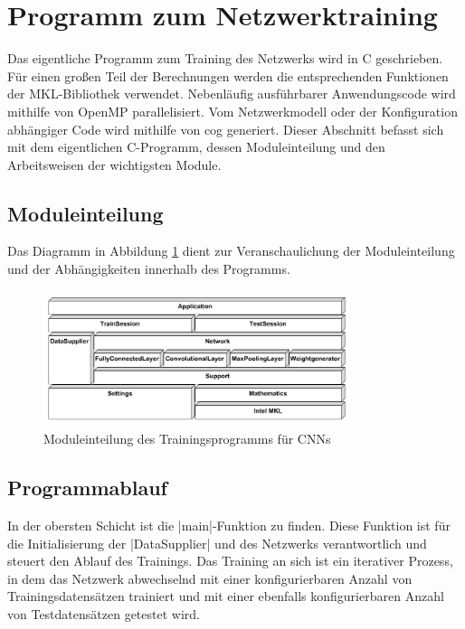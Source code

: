 \documentclass[../main.tex]{subfiles}
\begin{document}
\section{Programm zum Netzwerktraining}
Das eigentliche Programm zum Training des Netzwerks wird in C geschrieben. Für einen großen Teil der Berechnungen werden die entsprechenden Funktionen der MKL-Bibliothek verwendet. Nebenläufig ausführbarer Anwendungscode wird mithilfe von OpenMP parallelisiert. Vom Netzwerkmodell oder der Konfiguration abhängiger Code wird mithilfe von cog generiert. Dieser Abschnitt befasst sich mit dem eigentlichen C-Programm, dessen Moduleinteilung und den Arbeitsweisen der wichtigsten Module. 

\subsection{Moduleinteilung}
Das Diagramm in Abbildung \ref{pic:netexec_structure} dient zur Veranschaulichung der Moduleinteilung und der Abhängigkeiten innerhalb des Programms. 
\begin{figure}
	\centering 
	\includegraphics[width=0.8\textwidth]{../images/Schmidt/netexec_structure.jpg} 
	\caption {Moduleinteilung des Trainingsprogramms für CNNs}
	\label{pic:netexec_structure} 
\end{figure} 

\subsection{Programmablauf}
In der obersten Schicht ist die |main|-Funktion zu finden. Diese Funktion ist für die Initialisierung der |DataSupplier| und des Netzwerks verantwortlich und steuert den Ablauf des Trainings. Das Training an sich ist ein iterativer Prozess, in dem das Netzwerk abwechselnd mit einer konfigurierbaren Anzahl von Trainingsdatensätzen trainiert und mit einer ebenfalls konfigurierbaren Anzahl von Testdatensätzen getestet wird. 
\end{document}
